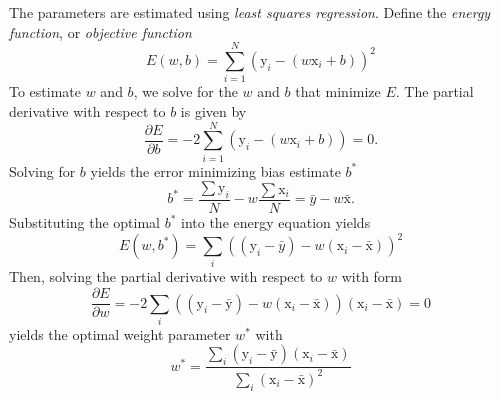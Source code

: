 \documentclass[11pt]{article}
\theoremstyle{plain}
\theoremstyle{definition}
\begin{document}
The parameters are estimated using \textit{least squares regression}. Define the \textit{energy function}, or \textit{objective function}
\begin{equation}
E\left(w,b\right) = \sum_{i=1}^N \left(\text{y}_i - \left(w\text{x}_i + b\right)\right)^2
\end{equation}
To estimate $w$ and $b$, we solve for the $w$ and $b$ that minimize $E$. The partial derivative with respect to $b$ is given by
\begin{equation}
\frac{\partial E}{\partial b} = -2 \sum_{i=1}^N \left(\text{y}_i - \left(w\text{x}_i + b\right)\right) = 0.
\end{equation}
Solving for $b$ yields the error minimizing bias estimate $b^*$
\begin{equation}
b^* = \frac{\sum \text{y}_i}{N} - w \frac{\sum \text{x}_i}{N} = \bar{y} - w\bar{\text{x}}.
\end{equation}
Substituting the optimal $b^*$ into the energy equation yields
\begin{equation}
E\left(w,b^*\right)= \sum_i \left(\left(\text{y}_i-\bar{y}\right) - w \left(\text{x}_i - \bar{\text{x}}\right)\right)^2
\end{equation}
Then, solving the partial derivative with respect to $w$ with form
\begin{equation}
\frac{\partial E}{\partial w} = -2 \sum_i \left(\left(\text{y}_i-\bar{\text{y}}\right) - w \left(\text{x}_i - \bar{\text{x}}\right)\right)\left(\text{x}_i - \bar{\text{x}}\right) = 0
\end{equation}
yields the optimal weight parameter $w^*$ with
\begin{equation}
w^* = \frac{\sum_i\left(\text{y}_i-\bar{\text{y}}\right)\left(\text{x}_i-\bar{\text{x}}\right)}{\sum_i\left(\text{x}_i-\bar{\text{x}}\right)^2}
\end{equation}
\end{document}
